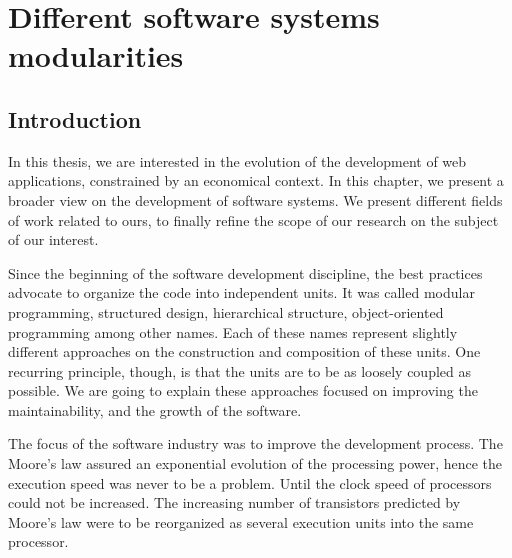 \chapter{Different software systems modularities} \label{chapter3}
\minitoc
\eject

\section{Introduction}

In this thesis, we are interested in the evolution of the development of web applications, constrained by an economical context.
In this chapter, we present a broader view on the development of software systems.
We present different fields of work related to ours, to finally refine the scope of our research on the subject of our interest.


Since the beginning of the software development discipline, the best practices advocate to organize the code into independent units.
It was called modular programming\cite{Parnas1972}, structured design\cite{Stevens1974}, hierarchical structure\cite{Dijkstra1968}, object-oriented programming among other names.
Each of these names represent slightly different approaches on the construction and composition of these units.
One recurring principle, though, is that the units are to be as loosely coupled as possible.
We are going to explain these approaches focused on improving the maintainability, and the growth of the software.




The focus of the software industry was to improve the development process.
The Moore's law\cite{Moore1965} assured an exponential evolution of the processing power, hence the execution speed was never to be a problem.
Until the clock speed of processors could not be increased.
The increasing number of transistors predicted by Moore's law were to be reorganized as several execution units into the same processor.

